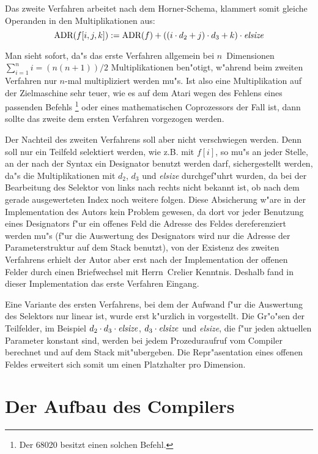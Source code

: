Das zweite Verfahren arbeitet nach dem Horner-Schema, klammert somit
gleiche Operanden in den Multiplikationen aus:
\[  \hbox{ADR}(f[i, j, k]) := \hbox{ADR}(f) + ((i\cdot d_2 + j)\cdot d_3 + k)\cdot
      \hbox{\it elsize\/}
\]

Man sieht sofort, da"s das erste Verfahren allgemein bei $n$~Dimensionen
$\sum_{i=1}^n i=(n(n+1))/2$ Multiplikationen ben"otigt, w"ahrend beim
zweiten Verfahren nur $n$-mal multipliziert werden mu"s.
Ist also eine Multiplikation auf der Zielmaschine sehr teuer, wie es auf
dem Atari wegen des Fehlens eines passenden Befehls%
\footnote{Der 68020 besitzt einen solchen Befehl.}
oder eines mathematischen Coprozessors der Fall ist, dann sollte das
zweite dem ersten Verfahren vorgezogen werden.

Der Nachteil des zweiten Verfahrens soll aber nicht verschwiegen werden.
Denn soll nur ein Teilfeld selektiert werden, wie z.B. mit $f[i]$, so mu"s
an jeder Stelle, an der nach der Syntax ein Designator benutzt werden darf,
sichergestellt werden, da"s die Multiplikationen mit $d_2$, $d_3$ und
\hbox{\it elsize\/} durchgef"uhrt wurden, da bei der Bearbeitung des
Selektor von links nach rechts nicht bekannt ist, ob nach dem gerade
ausgewerteten Index noch weitere folgen.
Diese Absicherung w"are in der Implementation des Autors kein Problem gewesen,
da dort vor jeder Benutzung eines Designators f"ur ein offenes Feld die Adresse
des Feldes dereferenziert werden mu"s (f"ur die Auswertung des Designators wird
nur die Adresse der Parameterstruktur auf dem Stack benutzt), von der Existenz
des zweiten Verfahrens erhielt der Autor aber erst nach der Implementation der
offenen Felder durch einen Briefwechsel mit Herrn~Crelier Kenntnis.
Deshalb fand in dieser Implementation das erste Verfahren Eingang.

Eine Variante des ersten Verfahrens, bei dem der Aufwand f"ur die Auswertung des
Selektors nur linear ist, wurde erst k"urzlich in \cite{macOberonImp} vorgestellt.
Die Gr"o"sen der Teilfelder, im Beispiel $d_2\cdot d_3\cdot \hbox{\it elsize\/}$,
$d_3\cdot \hbox{\it elsize\/}$ und \hbox{\it elsize\/}, die f"ur jeden aktuellen
Parameter konstant sind, werden bei jedem Prozeduraufruf vom Compiler berechnet
und auf dem Stack mit"ubergeben.
Die Repr"asentation eines offenen Feldes erweitert sich somit um einen Platzhalter
pro Dimension.

\newpage
\section{Der Aufbau des Compilers}

